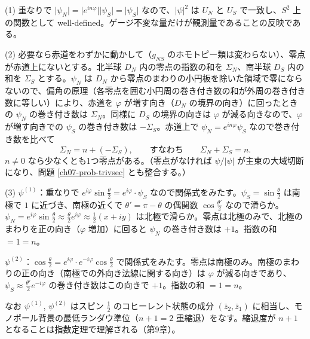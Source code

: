 \begin{solution}
(1) 重なりで $\lvert\psi_N\rvert=\lvert e^{in\varphi}\rvert\lvert\psi_S\rvert=\lvert\psi_S\rvert$ なので、$\lvert\psi\rvert^2$ は $U_N$ と $U_S$ で一致し、$S^2$ 上の関数として well-defined。ゲージ不変な量だけが観測量であることの反映である。

(2) 必要なら赤道をわずかに動かして（$g_{NS}$ のホモトピー類は変わらない）、零点が赤道上にないとする。北半球 $D_N$ 内の零点の指数の和を $\Sigma_N$、南半球 $D_S$ 内の和を $\Sigma_S$ とする。$\psi_N$ は $D_N$ から零点のまわりの小円板を除いた領域で零にならないので、偏角の原理（各零点を囲む小円周の巻き付き数の和が外周の巻き付き数に等しい）により、赤道を $\varphi$ が増す向き（$D_N$ の境界の向き）に回ったときの $\psi_N$ の巻き付き数は $\Sigma_N$。同様に $D_S$ の境界の向きは $\varphi$ が減る向きなので、$\varphi$ が増す向きでの $\psi_S$ の巻き付き数は $-\Sigma_S$。赤道上で $\psi_N=e^{in\varphi}\psi_S$ なので巻き付き数を比べて
\[
\Sigma_N=n+(-\Sigma_S),\qquad\text{すなわち}\qquad\Sigma_N+\Sigma_S=n .
\]
$n\neq0$ なら少なくとも1つ零点がある。（零点がなければ $\psi/\lvert\psi\rvert$ が主束の大域切断になり、問題 \ref{ch07-prob-trivsec} とも整合する。）

(3) $\psi^{(1)}$：重なりで $e^{i\varphi}\sin\frac\theta2=e^{i\varphi}\cdot\psi_S$ なので関係式をみたす。$\psi_S=\sin\frac\theta2$ は南極で $1$ に近づき、南極の近くで $\theta'=\pi-\theta$ の偶関数 $\cos\frac{\theta'}2$ なので滑らか。$\psi_N=e^{i\varphi}\sin\frac\theta2\approx\frac\theta2e^{i\varphi}\approx\frac12(x+iy)$ は北極で滑らか。零点は北極のみで、北極のまわりを正の向き（$\varphi$ 増加）に回ると $\psi_N$ の巻き付き数は $+1$。指数の和 $=1=n$。

$\psi^{(2)}$：$\cos\frac\theta2=e^{i\varphi}\cdot e^{-i\varphi}\cos\frac\theta2$ で関係式をみたす。零点は南極のみ。南極のまわりの正の向き（南極での外向き法線に関する向き）は $\varphi$ が減る向きであり、$\psi_S\approx\frac{\theta'}2e^{-i\varphi}$ の巻き付き数はこの向きで $+1$。指数の和 $=1=n$。

なお $\psi^{(1)}$, $\psi^{(2)}$ はスピン $\tfrac12$ のコヒーレント状態の成分 $(\bar z_2,\bar z_1)$ に相当し、モノポール背景の最低ランダウ準位（$n+1=2$ 重縮退）をなす。縮退度が $n+1$ となることは指数定理で理解される（第9章）。
\end{solution}

